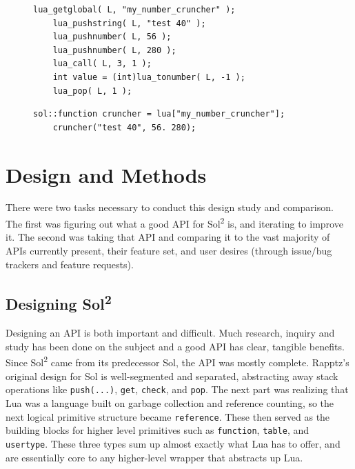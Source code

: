 \documentclass[conference,compsoc]{IEEEtran}
\newcommand{\soltwo}{Sol\textsuperscript{2}}
\begin{document}
\begin{figure}[ht!]
	\begin{lstlisting}[caption={Lua C API to call a function with 3 arguments and a single return value.}, 
	label={lst:function-call-lua}]
	lua_getglobal( L, "my_number_cruncher" );
	lua_pushstring( L, "test 40" );
	lua_pushnumber( L, 56 );
	lua_pushnumber( L, 280 );
	lua_call( L, 3, 1 );
	int value = (int)lua_tonumber( L, -1 );
	lua_pop( L, 1 );
	\end{lstlisting}
	\begin{lstlisting}[caption={Use of \soltwo{} to do exactly the same as \cref{lst:function-call-lua}.}, 
	label={lst:function-call-sol2}]
	sol::function cruncher = lua["my_number_cruncher"];
	cruncher("test 40", 56. 280);
	\end{lstlisting}
\end{figure}

\section{Design and Methods}

There were two tasks necessary to conduct this design study and comparison. The first was figuring out what a good API for \soltwo{} is, and iterating to improve it. The second was taking that API and comparing it to the vast majority of APIs currently present, their feature set, and user desires (through issue/bug trackers and feature requests).


\subsection{Designing \soltwo{}}

Designing an API is both important and difficult. Much research, inquiry and study has been done on the subject and a good API has clear, tangible benefits\cite{api-design}\cite{good-api}. Since \soltwo{} came from its predecessor Sol, the API was mostly complete. Rapptz's original design for Sol is well-segmented and separated, abstracting away stack operations like \lstinline|push(...)|, \lstinline|get|, \lstinline|check|, and \lstinline|pop|. The next part was realizing that Lua was a language built on garbage collection and reference counting, so the next logical primitive structure became \lstinline|reference|. These then served as the building blocks for higher level primitives such as \lstinline|function|, \lstinline|table|, and \lstinline|usertype|. These three types sum up almost exactly what Lua has to offer, and are essentially core to any higher-level wrapper that abstracts up Lua.
\end{document}
